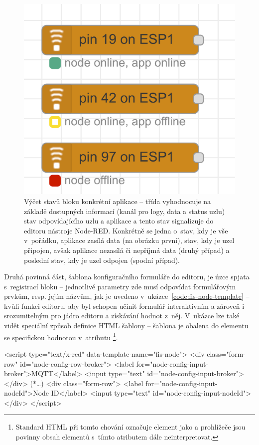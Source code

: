 \begin{figure}
    \centering
    \includegraphics[width=.5\textwidth]{figures/fis-node-status.png}
    \caption{Výčet stavů bloku konkrétní aplikace -- třída  vyhodnocuje na základě dostupných informací
    (kanál pro logy, data a status uzlu) stav odpovídajícího uzlu a aplikace a tento stav signalizuje do editoru
    nástroje Node-RED. Konkrétně se jedna o~stav, kdy je vše v~pořádku, aplikace zasílá data (na obrázku první),
    stav, kdy je uzel připojen, avšak aplikace nezasílá či nepříjmá data (druhý případ) a poslední stav,
    kdy je uzel odpojen (spodní případ).}
    \label{fig:fis-node-status}
\end{figure}

Druhá povinná část, šablona konfiguračního formuláře do editoru, je úzce spjata s~registrací bloku -- jednotlivé
parametry zde musí odpovídat formulářovým prvkům, resp. jejím názvům, jak je uvedeno
v~ukázce~\ref{code:fis-node-template} -- kvůli funkci editoru, aby byl schopen učinit
formulář interaktivním a zároveň i srozumitelným pro jádro editoru a získávání hodnot z~něj.
V~ukázce lze také vidět speciální způsob definice HTML šablony -- šablona je obalena do elementu  se
specifickou hodnotou v~atributu \footnote{Standard HTML při tomto chování označuje
element  jako  a prohlížeče jsou povinny obsah elementů s~tímto atributem dále
neinterpretovat.}.

\begin{code}[
    language=HTML,
    label=code:fis-node-template,
    caption={Ukázka z~implementace druhé povinné části deklarace bloku -- šablona formuláře v~jazyce HTML obsahuje
    jednotlivé vstupní pro pole pro korespondující parametry definovené v~registraci bloku do editoru
    v~ukázce~\ref{code:fis-node-constructor}.
    Atribut \ic{id="node-config-input-broker"} (a odpovídající) jsou důležité vzhledem k~chování editoru, nutná je shoda
    s~názvem parametru při registraci bloku -- stejně jako správné spárování šablony pomocí atributu
    \ic{data-template-name="fis-node"}.},
]
<script type="text/x-red" data-template-name="fis-node">
    <div class="form-row" id="node-config-row-broker">
        <label for="node-config-input-broker">MQTT</label>
        <input type="text" id="node-config-input-broker">
    </div>
    (*\ldots*)
    <div class="form-row">
        <label for="node-config-input-nodeId">Node ID</label>
        <input type="text" id="node-config-input-nodeId">
    </div>
</script>
\end{code}

